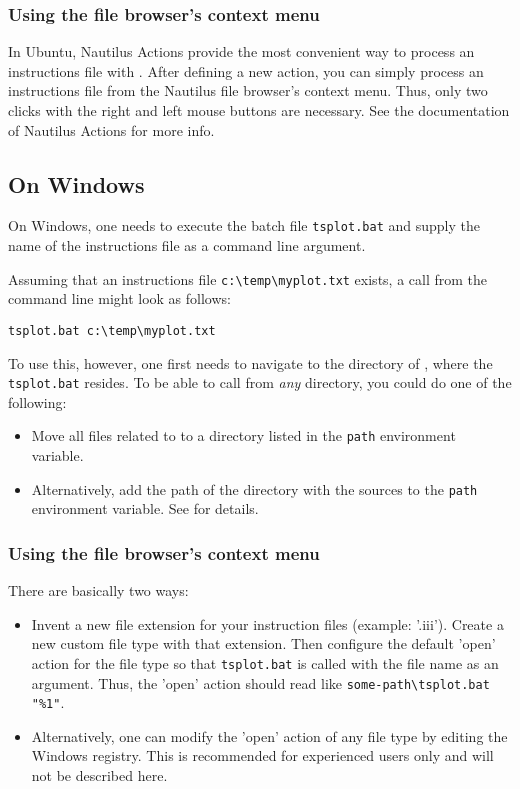 \subsubsection*{Using the file browser's context menu}
In Ubuntu, Nautilus Actions provide the most convenient way to process an instructions file with . After defining a new action, you can simply process an instructions file from the Nautilus file browser's context menu. Thus, only two clicks with the right and left mouse buttons are necessary. See the documentation of Nautilus Actions for more info.

\subsection{On Windows} \label{sec:tsplot:invoke-windows}

On Windows, one needs to execute the batch file \texttt{tsplot.bat} and supply the name of the instructions file as a command line argument.

Assuming that an instructions file \verb!c:\temp\myplot.txt! exists, a call from the command line might look as follows:

\begin{lstlisting}[style=shell]
  tsplot.bat c:\temp\myplot.txt
\end{lstlisting}

To use this, however, one first needs to navigate to the directory of , where the \texttt{tsplot.bat} resides. To be able to call  from \emph{any} directory, you could do one of the following:

\begin{itemize}
  \item Move all files related to  to a directory listed in the \verb!path! environment variable.
  \item Alternatively, add the path of the directory with the  sources to the \verb!path! environment variable. See \citet{Echse-Install-Doc} for details.
\end{itemize}

\subsubsection*{Using the file browser's context menu}
There are basically two ways:
\begin{itemize}
  \item Invent a new file extension for your instruction files (example: '.iii'). Create a new custom file type with that extension. Then configure the default 'open' action for the file type so that \texttt{tsplot.bat} is called with the file name as an argument. Thus, the 'open' action should read like \verb!some-path\tsplot.bat "%1"!.
  \item Alternatively, one can modify the 'open' action of any file type by editing the Windows registry. This is recommended for experienced users only and will not be described here.
\end{itemize}
